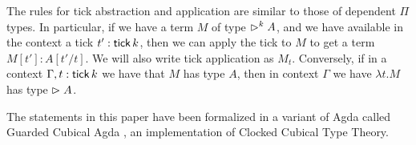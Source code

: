 
The rules for tick abstraction and application are similar to those of dependent
$\Pi$ types. 
In particular, if we have a term $M$ of type $\vartriangleright^k A$, and we
have available in the context a tick $t' : \mathsf{tick}\, k$, then we can apply the tick to $M$ to get
a term $M[t'] : A[t'/t]$. We will also write tick application as $M_t$.
Conversely, if in a context $\Gamma, t : \mathsf{tick}\, k$ we have that $M$ has type $A$,
then in context $\Gamma$ we have $\lambda t.M$ has type $\vartriangleright A$. %

The statements in this paper have been formalized in a variant of Agda called
Guarded Cubical Agda \cite{veltri-vezzosi2020}, an implementation of Clocked Cubical Type Theory.


